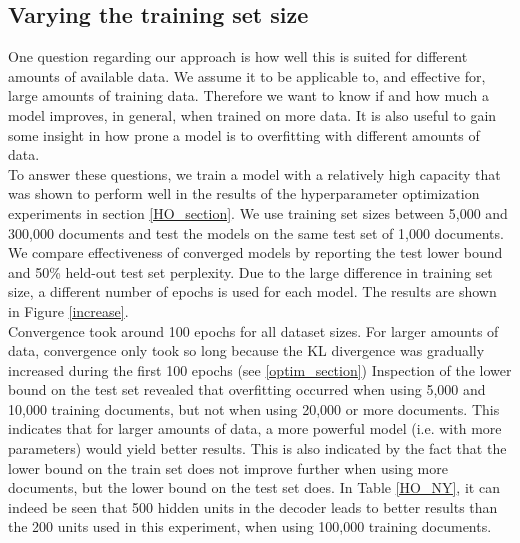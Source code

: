 \documentclass{report}
\begin{document}
	
	
	\subsection{Varying the training set size}
	One question regarding our approach is how well this is suited for different amounts of available data. We assume it to be applicable to, and effective for, large amounts of training data. Therefore we want to know if and how much a model improves, in general, when trained on more data. It is also useful to gain some insight in how prone a model is to overfitting with different amounts of data.\\
	To answer these questions, we train a model with a relatively high capacity that was shown to perform well in the results of the hyperparameter optimization experiments in section \ref{HO_section}. We use training set sizes between 5,000 and 300,000 documents and test the models on the same test set of 1,000 documents. We compare effectiveness of converged models by reporting the test lower bound and 50\% held-out test set perplexity. Due to the large difference in training set size, a different number of epochs is used for each model. The results are shown in Figure \ref{increase}. \\
	Convergence took around 100 epochs for all dataset sizes. For larger amounts of data, convergence only took so long because the KL divergence was gradually increased during the first 100 epochs (see \ref{optim_section})  Inspection of the lower bound on the test set revealed that overfitting occurred when using 5,000 and 10,000 training documents, but not when using 20,000 or more documents. This indicates that for larger amounts of data, a more powerful model (i.e. with more parameters) would yield better results. This is also indicated by the fact that the lower bound on the train set does not improve further when using more documents, but the lower bound on the test set does. In Table \ref{HO_NY}, it can indeed be seen that 500 hidden units in the decoder leads to better results than the 200 units used in this experiment, when using 100,000 training documents.
	
\end{document}
